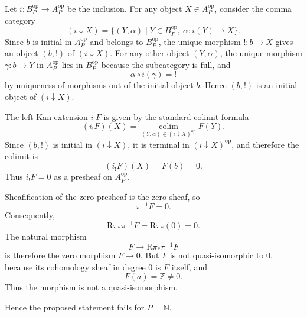 \documentclass[11pt]{article}
\begin{document}
Let \(i\colon B_P^{\mathrm{op}}\to A_P^{\mathrm{op}}\) be the inclusion. For any object \(X\in A_P^{\mathrm{op}}\), consider the comma category
\[
(i\downarrow X)=\{(Y,\alpha)\mid Y\in B_P^{\mathrm{op}},\ \alpha\colon i(Y)\to X\}.
\]
Since \(b\) is initial in \(A_P^{\mathrm{op}}\) and belongs to \(B_P^{\mathrm{op}}\), the unique morphism \(!\colon b\to X\) gives an object \((b,!)\) of \((i\downarrow X)\). For any other object \((Y,\alpha)\), the unique morphism \(\gamma\colon b\to Y\) in \(A_P^{\mathrm{op}}\) lies in \(B_P^{\mathrm{op}}\) because the subcategory is full, and
\[
\alpha\circ i(\gamma)=!
\]
by uniqueness of morphisms out of the initial object \(b\). Hence \((b,!)\) is an initial object of \((i\downarrow X)\).

The left Kan extension \(i_!F\) is given by the standard colimit formula
\[
(i_!F)(X)=\operatorname*{colim}_{(Y,\alpha)\in (i\downarrow X)^{\mathrm{op}}} F(Y).
\]
Since \((b,!)\) is initial in \((i\downarrow X)\), it is terminal in \((i\downarrow X)^{\mathrm{op}}\), and therefore the colimit is
\[
(i_!F)(X)=F(b)=0.
\]
Thus \(i_!F=0\) as a presheaf on \(A_P^{\mathrm{op}}\).

Sheafification of the zero presheaf is the zero sheaf, so
\[
\pi^{-1}F=0.
\]
Consequently,
\[
\mathrm R\pi_*\pi^{-1}F=\mathrm R\pi_*(0)=0.
\]
The natural morphism
\[
F\longrightarrow \mathrm R\pi_*\pi^{-1}F
\]
is therefore the zero morphism \(F\to 0\). But \(F\) is not quasi-isomorphic to \(0\), because its cohomology sheaf in degree \(0\) is \(F\) itself, and
\[
F(a)=\mathbb Z\neq 0.
\]
Thus the morphism is not a quasi-isomorphism.

Hence the proposed statement fails for \(P=\mathbb N\).
\end{document}
